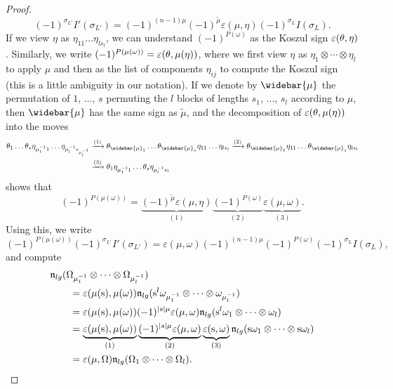 \documentclass[\MainFolder/Text.tex]{subfiles}
\begin{document}
\begin{proof}
$$ (-1)^{\sigma_{L'}}I'(\sigma_{L'}) = (-1)^{(n-1)\mu} (-1)^{\tilde{\mu}} \varepsilon(\mu, \eta) (-1)^{\sigma_L} I(\sigma_L). $$ 
If we view $\eta$ as $\eta_{11} \dots \eta_{l s_l}$, we can understand $(-1)^{P(\omega)}$ as the Koszul sign $\varepsilon(\SuspU, \eta)$. Similarly, we write $(-1)^{P(\mu(\omega))}=\varepsilon(\SuspU,\mu(\eta))$, where we first view $\eta$ as $\eta_1 \otimes \dotsb \otimes \eta_l$ to apply $\mu$ and then as the list of components $\eta_{ij}$ to compute the Koszul sign (this is a little ambiguity in our notation). If we denote by $\widebar{\mu}$ the permutation of $1$, $\dotsc$, $s$ permuting the $l$ blocks of lengths $s_1$, $\dotsc$, $s_l$ according to $\mu$, then $\widebar{\mu}$ has the same sign as $\tilde{\mu}$, and the decomposition of $\varepsilon(\SuspU,\mu(\eta))$ into the moves
$$ \begin{aligned}
\SuspU_{1} \dots \SuspU_{s} \eta_{\mu_1^{-1}1} \dots \eta_{\mu_l^{-1} s_{\mu_l^{-1}}} &\xrightarrow{(1)} \SuspU_{\widebar{\mu}_{1}} \dots \SuspU_{\widebar{\mu}_{s}} \eta_{11} \dots \eta_{l s_l} \xrightarrow{(2)} \SuspU_{\widebar{\mu}_1} \eta_{11} \dots \SuspU_{\widebar{\mu}_s} \eta_{l s_l} \\ &\xrightarrow{(3)} \SuspU_{1} \eta_{\mu_1^{-1}1} \dots \SuspU_{s} \eta_{\mu_l^{-1} s_l} \end{aligned} $$
shows that
$$ (-1)^{P(\mu(\omega))} = \underbrace{(-1)^{\tilde{\mu}}\varepsilon(\mu,\eta)}_{(1)} \underbrace{(-1)^{P(\omega)}}_{(2)}\underbrace{\varepsilon(\mu,\omega)}_{(3)}. $$
Using this, we write
$$ (-1)^{P(\mu(\omega))} (-1)^{\sigma_{L'}} I'(\sigma_{L'}) = \varepsilon(\mu,\omega) (-1)^{(n-1)\mu} (-1)^{P(\omega)}(-1)^{\sigma_L} I(\sigma_L), $$
and compute
$$ \begin{aligned}
& \PMC_{lg}(\Omega_{\mu_1^{-1}} \otimes \dotsb \otimes \Omega_{\mu_l^{-1}}) \\ & \qquad =\varepsilon(\mu(\Susp), \mu(\omega)) \PMC_{lg}(\Susp^l \omega_{\mu_1^{-1}} \otimes \dotsb \otimes \omega_{\mu_l^{-1}}) \\ 
& \qquad= \varepsilon(\mu(\Susp), \mu(\omega)) (-1)^{\Abs{s}\mu} \varepsilon(\mu,\omega) \PMC_{lg}(\Susp^l \omega_{1} \otimes \dotsb \otimes \omega_{l}) \\
& \qquad= \underbrace{\varepsilon(\mu(\Susp), \mu(\omega))}_{(1)} \underbrace{(-1)^{\Abs{s}\mu} \varepsilon(\mu,\omega)}_{(2)} \underbrace{\varepsilon(\Susp,\omega)}_{(3)} \PMC_{lg}(\Susp\omega_{1} \otimes \dotsb \otimes \Susp \omega_{l}) \\
& \qquad= \varepsilon(\mu,\Omega) \PMC_{lg}(\Omega_{1} \otimes \dotsb \otimes \Omega_{l}).

\end{aligned}$$
\end{proof}
\end{document}
